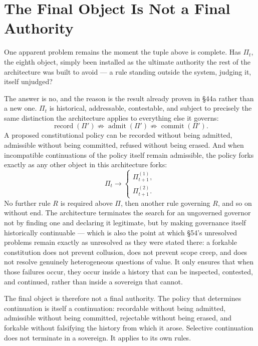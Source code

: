 \documentclass[12pt]{article}
\begin{document}
\section{The Final Object Is Not a Final Authority}

One apparent problem remains the moment the tuple above is complete. Has $\Pi_t$, the eighth object, simply been installed as the ultimate authority the rest of the architecture was built to avoid — a rule standing outside the system, judging it, itself unjudged?

The answer is no, and the reason is the result already proven in \S44a rather than a new one. $\Pi_t$ is historical, addressable, contestable, and subject to precisely the same distinction the architecture applies to everything else it governs:
\[
\operatorname{record}(\Pi')\not\Rightarrow\operatorname{admit}(\Pi')\not\Rightarrow\operatorname{commit}(\Pi').
\]
A proposed constitutional policy can be recorded without being admitted, admissible without being committed, refused without being erased. And when incompatible continuations of the policy itself remain admissible, the policy forks exactly as any other object in this architecture forks:
\[
\Pi_t\longrightarrow\begin{cases}\Pi_{t+1}^{(1)},\\ \Pi_{t+1}^{(2)}.\end{cases}
\]
No further rule $R$ is required above $\Pi$, then another rule governing $R$, and so on without end. The architecture terminates the search for an ungoverned governor not by finding one and declaring it legitimate, but by making governance itself historically continuable — which is also the point at which \S54's unresolved problems remain exactly as unresolved as they were stated there: a forkable constitution does not prevent collusion, does not prevent scope creep, and does not resolve genuinely heterogeneous questions of value. It only ensures that when those failures occur, they occur inside a history that can be inspected, contested, and continued, rather than inside a sovereign that cannot.

The final object is therefore not a final authority. The policy that determines continuation is itself a continuation: recordable without being admitted, admissible without being committed, rejectable without being erased, and forkable without falsifying the history from which it arose. Selective continuation does not terminate in a sovereign. It applies to its own rules.
\end{document}
